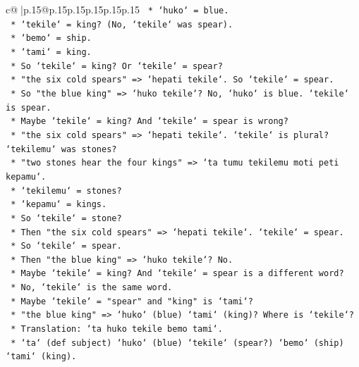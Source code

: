 \documentclass{article}
\begin{document}
{\begin{supertabular}{c@{$\;$}|p{.15\linewidth}@{}p{.15\linewidth}p{.15\linewidth}p{.15\linewidth}p{.15\linewidth}p{.15\linewidth}}
{{{\texttt{                    *   `huko` = blue.} \\
\texttt{                    *   `tekile` = king? (No, `tekile` was spear).} \\
\texttt{                    *   `bemo` = ship.} \\
\texttt{                    *   `tami` = king.} \\
\texttt{                    *   So `tekile` = king? Or `tekile` = spear?} \\
\texttt{                    *   "the six cold spears" => `hepati tekile`. So `tekile` = spear.} \\
\texttt{                    *   So "the blue king" => `huko tekile`? No, `huko` is blue. `tekile` is spear.} \\
\texttt{                    *   Maybe `tekile` = king? And `tekile` = spear is wrong?} \\
\texttt{                    *   "the six cold spears" => `hepati tekile`. `tekile` is plural? `tekilemu` was stones?} \\
\texttt{                    *   "two stones hear the four kings" => `ta tumu tekilemu moti peti kepamu`.} \\
\texttt{                        *   `tekilemu` = stones?} \\
\texttt{                        *   `kepamu` = kings.} \\
\texttt{                    *   So `tekile` = stone?} \\
\texttt{                    *   Then "the six cold spears" => `hepati tekile`. `tekile` = spear.} \\
\texttt{                    *   So `tekile` = spear.} \\
\texttt{                    *   Then "the blue king" => `huko tekile`? No.} \\
\texttt{                    *   Maybe `tekile` = king? And `tekile` = spear is a different word?} \\
\texttt{                    *   No, `tekile` is the same word.} \\
\texttt{                    *   Maybe `tekile` = "spear" and "king" is `tami`?} \\
\texttt{                    *   "the blue king" => `huko` (blue) `tami` (king)? Where is `tekile`?} \\
\texttt{                    *   Translation: `ta huko tekile bemo tami`.} \\
\texttt{                    *   `ta` (def subject) `huko` (blue) `tekile` (spear?) `bemo` (ship) `tami` (king).} \\
}}}
\end{supertabular}}
\end{document}
